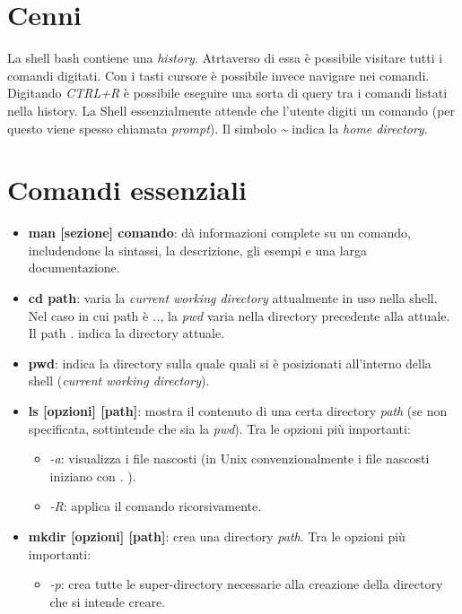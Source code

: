 \section{Cenni}
La shell bash contiene una \textit{history}. Atrtaverso di essa è possibile visitare tutti i comandi digitati. Con i tasti cursore è possibile invece navigare nei comandi.
Digitando \textit{CTRL+R} è possibile eseguire una sorta di query tra i comandi listati nella history.
La Shell essenzialmente attende che l'utente digiti un comando (per questo viene spesso chiamata \textit{prompt}).
Il simbolo \textit{\~} indica la \textit{home directory}.

\section{Comandi essenziali}
\begin{itemize}
    \item \textbf{man [sezione] comando}: dà informazioni complete su un comando, includendone la sintassi, la descrizione, gli esempi e una larga documentazione.
    \item \textbf{cd path}: varia la \textit{current working directory} attualmente in uso nella shell. Nel caso in cui path è \textit{..}, la \textit{pwd} varia nella directory precedente alla attuale. Il path \textit{.} indica la directory attuale.
    \item \textbf{pwd}: indica la directory sulla quale quali si è posizionati all'interno della shell (\textit{current working directory}).
    \item \textbf{ls [opzioni] [path]}: mostra il contenuto di una certa directory \textit{path} (se non specificata, sottintende che sia la \textit{pwd}). Tra le opzioni più importanti:
    \begin{itemize}
        \item \textit{-a}: visualizza i file nascosti (in Unix convenzionalmente i file nascosti iniziano con \textit{.} ).
        \item \textit{-R}: applica il comando ricorsivamente.
    \end{itemize}
    \item \textbf{mkdir [opzioni] [path]}: crea una directory \textit{path}. Tra le opzioni più importanti:
    \begin{itemize}
        \item \textit{-p}: crea tutte le super-directory necessarie alla creazione della directory che si intende creare.
    \end{itemize}

\end{itemize}
